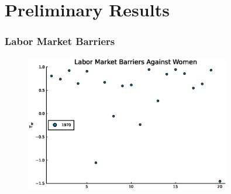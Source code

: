 \documentclass[11pt]{beamer}
\begin{document}

\section{Preliminary Results}

\begin{frame}
\frametitle{Labor Market Barriers}
\label{barriers}
\begin{figure}
\begin{center}
\includegraphics[width=0.8\textwidth]{plots/tau_w_women_70.eps}
\label{ }
\end{center}
\end{figure}
\hyperlink{occupations}{}
\end{frame}
\end{document}
